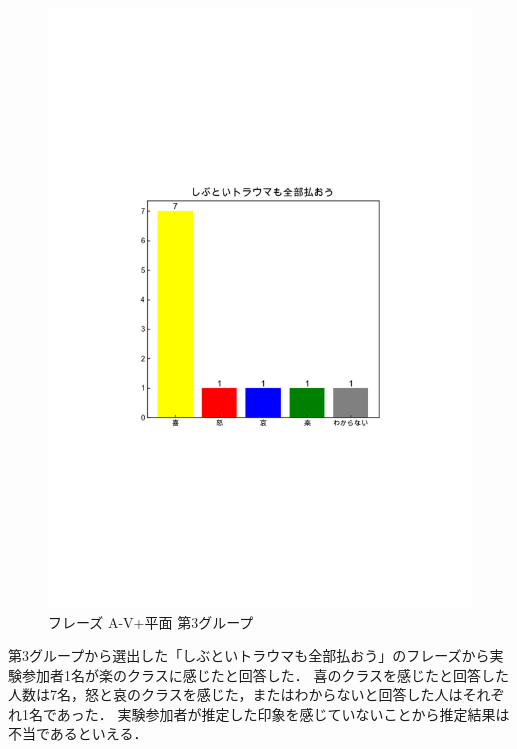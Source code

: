\begin{figure}[H]
    \centering
    \includegraphics[width=14cm]{4312.pdf}
    \vspace{-1mm}
    \caption{フレーズ A-V+平面 第3グループ}
    \label{fig:mms}
    \vspace{5mm}
\end{figure}
第3グループから選出した「しぶといトラウマも全部払おう」のフレーズから実験参加者1名が楽のクラスに感じたと回答した．
喜のクラスを感じたと回答した人数は7名，怒と哀のクラスを感じた，またはわからないと回答した人はそれぞれ1名であった．
実験参加者が推定した印象を感じていないことから推定結果は不当であるといえる．
\newpage
